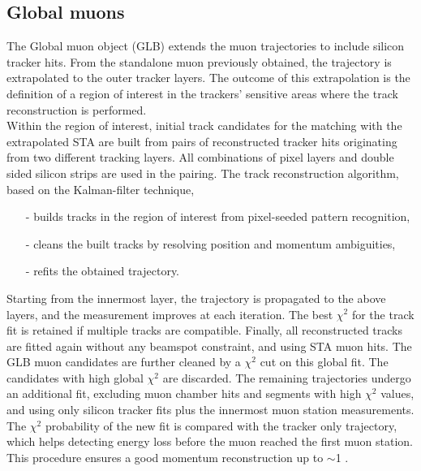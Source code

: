 \subsection{Global muons}
\label{sec:GLB}
The Global muon object (GLB) extends the muon trajectories to include
silicon tracker hits. From the standalone muon previously obtained,
the trajectory is extrapolated to the outer tracker layers. The
outcome of this extrapolation is the definition of a region of
interest in the trackers' sensitive areas where the track reconstruction is
performed.
\\
Within the region of interest, initial track candidates for the matching
with the extrapolated STA are built from pairs of reconstructed
tracker hits originating from two different tracking layers. All
combinations of pixel layers and double sided silicon strips are used
in the pairing. The track reconstruction algorithm, based on the
Kalman-filter technique,
\begin{itemize}

\item[-] builds tracks in the region of interest from
pixel-seeded pattern recognition,
\item[-] cleans the built tracks by resolving
position and momentum ambiguities,
\item[-] refits the obtained
trajectory.

\end{itemize} Starting from the innermost layer, the trajectory is
propagated to the above layers, and the measurement improves at each
iteration. The best $\chi^{2}$ for the track fit is retained if
multiple tracks are compatible. Finally, all reconstructed tracks are
fitted again without any beamspot constraint, and using STA muon
hits. The GLB muon candidates are further cleaned by a $\chi^{2}$ cut
on this global fit. The candidates with high global $\chi^{2}$ are
discarded. The remaining trajectories undergo an additional fit, excluding
muon chamber hits and segments with high  $\chi^{2}$ values, and using
only silicon tracker fits plus the innermost muon station
measurements. The  $\chi^{2}$ probability of the new fit is compared
with the tracker only trajectory, which helps detecting energy loss
before the muon reached the first muon station. This procedure ensures
a good momentum reconstruction up to \pt$\sim$1 \TeVc.

